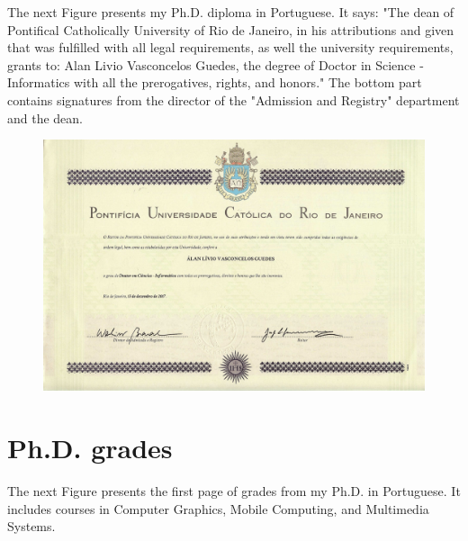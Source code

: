 \documentclass[10pt,a4paper,sans,colorlinks]{moderncv}
\begin{document}
The next Figure presents my Ph.D. diploma in Portuguese.
It says: "The dean of Pontifical Catholically University of Rio de Janeiro, in his attributions and given that was fulfilled with all legal requirements, as well the university requirements, grants to: Alan Livio Vasconcelos Guedes, the degree of Doctor in Science - Informatics with all the prerogatives, rights, and honors."
The bottom part contains signatures from the director of the "Admission and Registry" department and the dean.

\begin{figure}
    \centering
    \includegraphics[align=t,width=\textwidth,height=0.75\textheight, keepaspectratio=true, trim={6cm 0 3cm 0},clip]{certificates/phd-diploma.pdf}
\end{figure}

\newpage

\section{Ph.D. grades}

The next Figure presents the first page of grades from my Ph.D. in Portuguese.
It includes courses in Computer Graphics, Mobile Computing, and Multimedia Systems.
\end{document}
